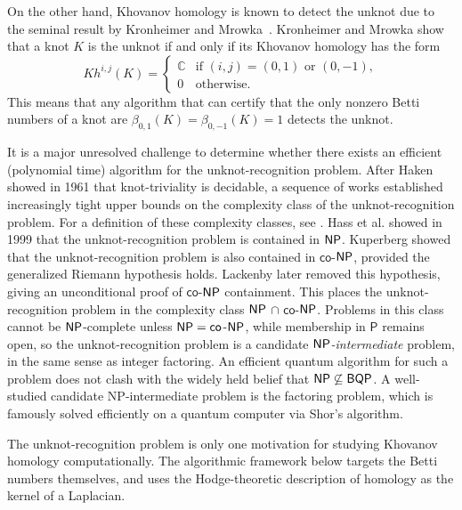 \documentclass[a4paper,onecolumn,unpublished]{quantumarticle}
\theoremstyle{plain}
\theoremstyle{definition}
\theoremstyle{definition}
\numberwithin{equation}{section}
\begin{document}
On the other hand, Khovanov homology is known to detect the unknot due to the seminal result by Kronheimer and Mrowka~\cite{KM}.  Kronheimer and Mrowka show that a knot $K$ is the unknot if and only if its Khovanov homology has the form
\begin{equation}
Kh^{i,j}(K) = \begin{cases} 
\mathbb{C} & \text{if } (i,j) = (0,1) \text{ or } (0,-1), \\
0 & \text{otherwise}. 
\end{cases}
\end{equation}
This means that any algorithm that can certify that the only nonzero Betti numbers of a knot are $\beta_{0,1}(K) = \beta_{0,-1}(K) = 1$ detects the unknot. 

It is a major unresolved challenge to determine whether there exists an efficient (polynomial time) algorithm for the unknot-recognition problem. After Haken \cite{haken1961theorie} showed in 1961 that knot-triviality is decidable, a sequence of works established increasingly tight upper bounds on the complexity class of the unknot-recognition problem. For a definition of these complexity classes, see . Hass et al. \cite{HLP} showed in 1999 that the unknot-recognition problem is contained in $\mathsf{NP}$. Kuperberg \cite{kuperberg2014knottedness} showed that the unknot-recognition problem is also contained in $\mathsf{co}$-$\mathsf{NP}$, provided the generalized Riemann hypothesis holds. Lackenby \cite{lackenby2021efficient} later removed this hypothesis, giving an unconditional proof of $\mathsf{co}$-$\mathsf{NP}$ containment. This places the unknot-recognition problem in the complexity class $\mathsf{NP}$ $\cap$ $\mathsf{co}$-$\mathsf{NP}$.  Problems in this class cannot be $\mathsf{NP}$-complete unless $\mathsf{NP}=\mathsf{co}$-$\mathsf{NP}$, while membership in $\mathsf{P}$ remains open, so the unknot-recognition problem is a candidate \emph{$\mathsf{NP}$-intermediate} problem, in the same sense as integer factoring. An efficient quantum algorithm for such a problem does not clash with the widely held belief that $\mathsf{NP} \not \subseteq \mathsf{BQP}$. A well-studied candidate NP-intermediate problem is the factoring problem, which is famously solved efficiently on a quantum computer via Shor's algorithm. 

The unknot-recognition problem is only one motivation for studying Khovanov homology computationally.  The algorithmic framework below targets the Betti numbers themselves, and uses the Hodge-theoretic description of homology as the kernel of a Laplacian.
\end{document}
